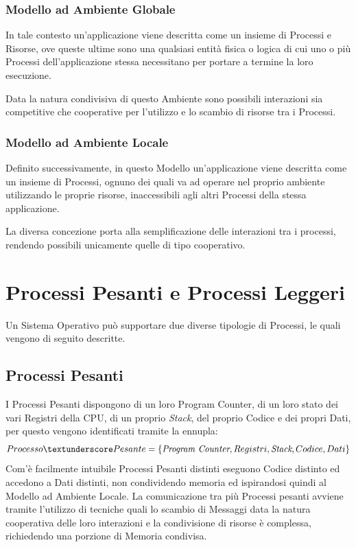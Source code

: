 \subsubsection{Modello ad Ambiente Globale}
In tale contesto un'applicazione viene descritta come un insieme di Processi e Risorse, ove queste ultime sono una qualsiasi entità fisica o logica di cui uno o più Processi dell'applicazione stessa necessitano per portare a termine la loro esecuzione. \par
Data la natura condivisiva di questo Ambiente sono possibili interazioni sia competitive che cooperative per l'utilizzo e lo scambio di risorse tra i Processi.
\subsubsection{Modello ad Ambiente Locale}
Definito successivamente, in questo Modello un'applicazione viene descritta come un insieme di Processi, ognuno dei quali va ad operare nel proprio ambiente utilizzando le proprie risorse, inaccessibili agli altri Processi della stessa applicazione. \par
La diversa concezione porta alla semplificazione delle interazioni tra i processi, rendendo possibili unicamente quelle di tipo cooperativo.

\section{Processi Pesanti e Processi Leggeri}
Un Sistema Operativo può supportare due diverse tipologie di Processi, le quali vengono di seguito descritte\cite{ThreadDispense}.
\subsection{Processi Pesanti} 
I Processi Pesanti dispongono di un loro Program Counter, di un loro stato dei vari Registri della CPU, di un proprio \textit{Stack}, del proprio Codice e dei propri Dati, per questo vengono identificati tramite la ennupla:
$$ Processo\textunderscore Pesante = \{\textit{Program Counter}, Registri, \textit{Stack}, Codice, Dati\} $$
Com'è facilmente intuibile Processi Pesanti distinti eseguono Codice distinto ed accedono a Dati distinti, non condividendo memoria ed ispirandosi quindi al Modello ad Ambiente Locale. La comunicazione tra più Processi pesanti avviene tramite l'utilizzo di tecniche quali lo scambio di Messaggi data la natura cooperativa delle loro interazioni e la condivisione di risorse è complessa, richiedendo una porzione di Memoria condivisa.
